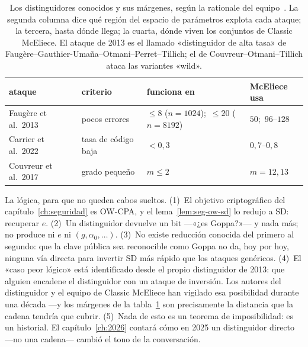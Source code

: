 \documentclass[11pt,a4paper,oneside]{report}
\begin{document}
\begin{table}[htbp]
\centering
\footnotesize
\setlength{\tabcolsep}{6pt}
\begin{tabular}{llll}
\toprule
ataque & criterio & funciona en & McEliece usa\\
\midrule
Faugère et al.\ 2013~\cite{faugere2013} & pocos errores &
  $\le 8$ ($n=1024$);\ $\le 20$ ($n=8192$) & $50$;\ $96$--$128$\\
Carrier et al.\ 2022~\cite{carrier2022} & tasa de código baja &
  $<0{,}3$ & $0{,}7$--$0{,}8$\\
Couvreur et al.\ 2017~\cite{couvreur2017} & grado pequeño &
  $m\le 2$ & $m=12,13$\\
\bottomrule
\end{tabular}
\caption{Los distinguidores conocidos y sus márgenes, según la
rationale del equipo~\cite{cmrationale}. La segunda columna dice qué
región del espacio de parámetros explota cada ataque; la tercera,
hasta dónde llega; la cuarta, dónde viven los conjuntos de Classic
McEliece. El ataque de 2013 es el llamado «distinguidor de alta
tasa» de Faugère--Gauthier-Umaña--Otmani--Perret--Tillich; el de
Couvreur--Otmani--Tillich ataca las variantes «wild».}
\label{tab:est-margenes}
\end{table}

\begin{rigor}
La lógica, para que no queden cabos sueltos. (1)~El objetivo
criptográfico del capítulo~\ref{ch:seguridad} es OW-CPA, y el
lema~\ref{lem:seg-ow-sd} lo redujo a SD: recuperar $e$. (2)~Un
distinguidor devuelve un bit ---«¿es Goppa?»--- y nada más; no
produce ni $e$ ni $(g,\alpha_0,\dots)$. (3)~No existe reducción
conocida del primero al segundo: que la clave pública sea
reconocible como Goppa no da, hoy por hoy, ninguna vía directa para
invertir SD más rápido que los ataques genéricos. (4)~El «caso
peor lógico» está identificado desde el propio distinguidor de
2013: que alguien encadene el distinguidor con un ataque de
inversión. Los autores del distinguidor y el equipo de Classic
McEliece han vigilado esa posibilidad durante una década ---y los
márgenes de la tabla~\ref{tab:est-margenes} son precisamente la
distancia que la cadena tendría que cubrir. (5)~Nada de esto es un
teorema de imposibilidad: es un historial. El capítulo~\ref{ch:2026}
contará cómo en 2025 un distinguidor directo ---no una cadena---
cambió el tono de la conversación.
\end{rigor}
\end{document}
